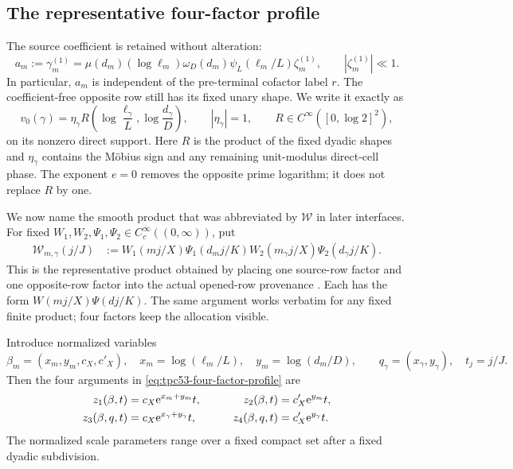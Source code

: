 \subsection{The representative four-factor profile}

The source coefficient is retained without alteration:
\begin{equation}
 a_m:=\gamma_m^{(1)}
 =\mu(d_m)(\log\ell_m)\omega_D(d_m)
   \psi_L(\ell_m/L)\zeta_m^{(1)},
 \qquad |\zeta_m^{(1)}|\ll1.
 \label{eq:tpc53-source-coefficient}
\end{equation}
In particular, \(a_m\) is independent of the pre-terminal cofactor
label \(r\).  The coefficient-free opposite row still has its fixed
unary shape.  We write it exactly as
\begin{equation}
 v_0(\gamma)=\eta_\gamma
 R\!\left(\log\frac{\ell_\gamma}{L},
          \log\frac{d_\gamma}{D}\right),\qquad
 |\eta_\gamma|=1,\qquad
 R\in C^\infty([0,\log2]^2),
 \label{eq:tpc53-opposite-unary-shape}
\end{equation}
on its nonzero direct support.  Here \(R\) is the product of the fixed
dyadic shapes and \(\eta_\gamma\) contains the M\"obius sign and any
remaining unit-modulus direct-cell phase.  The exponent \(e=0\) removes
the opposite prime logarithm; it does not replace \(R\) by one.

We now name the smooth product that was abbreviated by
\(\mathcal W\) in later interfaces.  For fixed
\(W_1,W_2,\Psi_1,\Psi_2\in C_c^\infty((0,\infty))\), put
\begin{align}
 \mathcal W_{m,\gamma}(j/J)
 &:={}
 W_1(mj/X)\Psi_1(d_mj/K)
 W_2(m_\gamma j/X)\Psi_2(d_\gamma j/K).
 \label{eq:tpc53-four-factor-profile}
\end{align}
This is the representative product obtained by placing one source-row
factor and one opposite-row factor into the actual opened-row
provenance \citep{WangTPC25}.  Each has the form
\(W(mj/X)\Psi(dj/K)\).  The same argument works verbatim for any fixed
finite product; four factors keep the allocation visible.

Introduce normalized variables
\begin{equation}
 \beta_m=(x_m,y_m,c_X,c'_X),\quad
 x_m=\log(\ell_m/L),\quad y_m=\log(d_m/D),
 \qquad
 q_\gamma=(x_\gamma,y_\gamma),\quad t_j=j/J.
 \label{eq:tpc53-normalized-variables}
\end{equation}
Then the four arguments in \eqref{eq:tpc53-four-factor-profile} are
\begin{equation}
 \begin{aligned}
 z_1(\beta,t)&=c_X\mathrm e^{x_m+y_m}t,
 &\qquad z_2(\beta,t)&=c'_X\mathrm e^{y_m}t,\\
 z_3(\beta,q,t)&=c_X\mathrm e^{x_\gamma+y_\gamma}t,
 &\qquad z_4(\beta,q,t)&=c'_X\mathrm e^{y_\gamma}t.
 \end{aligned}
 \label{eq:tpc53-four-arguments}
\end{equation}
The normalized scale parameters range over a fixed compact set after a
fixed dyadic subdivision.

